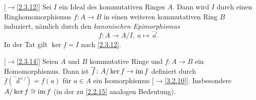 \documentclass[../../main.tex]{subfiles}
\begin{document}
\begin{bem}{\rm[$\to$\ref{2.3.12}]}\label{3.3.17}
Sei $I$ ein Ideal des kommutativen Ringes $A$. Dann wird $I$ durch einen Ringhomomorphismus
$f\colon A\to B$ in einen weiteren kommutativen Ring $B$ induziert, nämlich durch den \emph{kanonischen Epimorphismus}
$$f\colon A\to A/I,\ a\mapsto\overset{-_I}a.$$
In der Tat gilt $\ker f=I$ nach \ref{2.3.12}.
\end{bem}

\begin{kor}\label{isothmring} {\rm[$\to$\ref{2.3.14}]}
Seien $A$ und $B$ kommutative Ringe und $f\colon A\to B$ ein Homomorphismus.
Dann ist $\overline f\colon A/\ker f\to\operatorname{im} f$
definiert durch $\overline f(\overset{-_{\ker f}}{a~~})=f(a)$ für $a\in A$ ein Isomorphismus {\rm[$\to$\ref{3.2.10}]}. Insbesondere $A/\ker f\cong\operatorname{im} f$ (in der zu \ref{2.2.15} analogen Bedeutung).
\end{kor}
\end{document}
